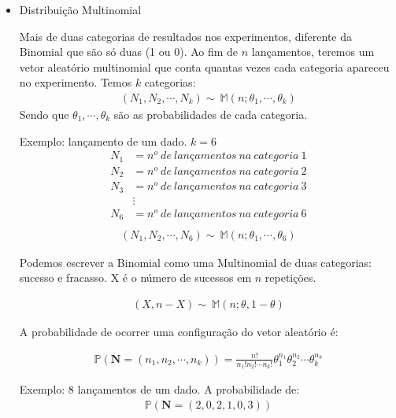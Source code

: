 \documentclass[11pt,a4paper]{book}
\begin{document}
\begin{itemize}
		\item Distribuição Multinomial
		
		Mais de duas categorias de resultados nos experimentos, diferente da Binomial que são só duas (1 ou 0).
		Ao fim de $n$ lançamentos, teremos um vetor aleatório multinomial que conta quantas vezes cada categoria apareceu no experimento.
		Temos $k$ categorias:
		\begin{align*}
			(N_1,N_2,\cdots,N_k)\sim~\mathbb{M}(n;\theta_1,\cdots,\theta_k)
		\end{align*}
		Sendo que $\theta_1,\cdots,\theta_k$ são as probabilidades de cada categoria.
		
		Exemplo: lançamento de um dado.
		$k=6$
		\begin{align*}
			N_1&=n^o~de~lançamentos~na~categoria~1\\
			N_2&=n^o~de~lançamentos~na~categoria~2\\
			N_3&=n^o~de~lançamentos~na~categoria~3\\
			&\vdots \\
			N_6&=n^o~de~lançamentos~na~categoria~6\\
		\end{align*}
		\begin{align*}
			(N_1,N_2,\cdots,N_6)\sim~\mathbb{M}(n;\theta_1,\cdots,\theta_6)
		\end{align*}
		
		Podemos escrever a Binomial como uma Multinomial de duas categorias: sucesso e fracasso.
		X é o número de sucessos em $n$ repetições.
		
		\begin{align*}
			(X,n-X)\sim~\mathbb{M}(n;\theta,1-\theta)
		\end{align*}
		
		A probabilidade de ocorrer uma configuração do vetor aleatório é:
		
		\begin{align}
			\mathbb{P}(\textbf{N}=(n_1,n_2,\cdots,n_k))=\frac{n!}{n_1!n_2!\cdots n_k!}\theta_{1}^{n_1}\theta_{2}^{n_2}\cdots\theta_{k}^{n_k}
			\label{eq:eq1}
		\end{align}
		
		Exemplo:
		8 lançamentos de um dado.
		A probabilidade de:
		\begin{align*}
			\mathbb{P}(\textbf{N}=(2,0,2,1,0,3))
		\end{align*}
		

\end{itemize}
\end{document}
